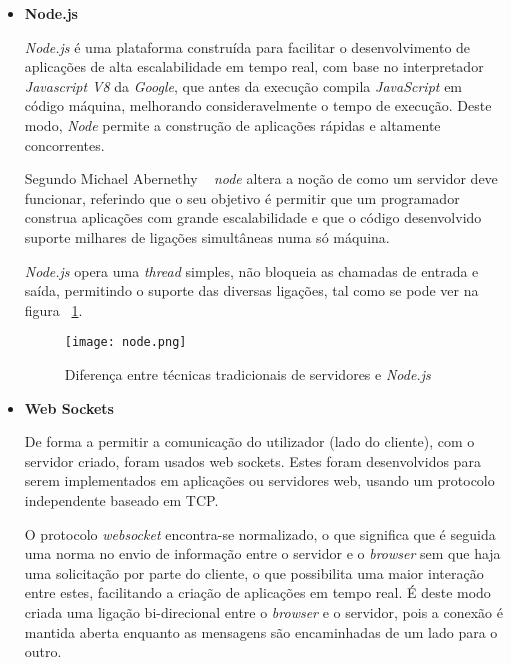 \begin{itemize}

\item \textbf{Node.js}


\textit{Node.js} é uma plataforma construída para facilitar o desenvolvimento de aplicações de alta escalabilidade em tempo real, com base no interpretador \textit{Javascript V8} da \textit{Google}, que antes da execução compila \textit{JavaScript} em código máquina, melhorando consideravelmente o tempo de execução. Deste modo, \textit{Node} permite a construção de aplicações rápidas e altamente concorrentes.

Segundo Michael Abernethy ~\cite{Abernethy2011} \textit{node} altera a noção de como um servidor deve funcionar, referindo que o seu objetivo é permitir que um programador construa aplicações com grande escalabilidade e que o código desenvolvido suporte milhares de ligações simultâneas numa só máquina. 

\textit{Node.js} opera uma \textit{thread} simples, não bloqueia as chamadas de entrada e saída, permitindo o suporte das diversas ligações, tal como se pode ver na figura ~\ref{fig:node}.

\begin{figure}[ht]
\centering
\texttt{[image: node.png]}
\caption[\textit{Node.js}] {Diferença entre técnicas tradicionais de servidores e \textit{Node.js}\protect\footnotemark}
\label{fig:node}
\end{figure}


\pagebreak

\item \textbf{Web Sockets}

De forma a permitir a comunicação do utilizador (lado do cliente), com o servidor criado, foram usados web sockets. Estes foram desenvolvidos para serem implementados em aplicações ou servidores web, usando um protocolo independente baseado em TCP.

O protocolo \textit{websocket} encontra-se normalizado, o que significa que é seguida uma norma no envio de informação entre o servidor e o \textit{browser} sem que haja uma solicitação por parte do cliente, o que possibilita uma maior interação entre estes, facilitando a criação de aplicações em tempo real. É deste modo criada uma ligação bi-direcional entre o \textit{browser} e o servidor, pois a conexão é mantida aberta enquanto as mensagens são encaminhadas de um lado para o outro.



\end{itemize}

